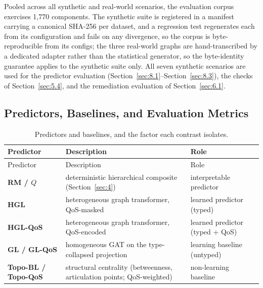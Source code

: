 Pooled across all synthetic and real-world scenarios, the evaluation corpus exercises 1,770
components. The synthetic suite is registered in a manifest carrying a canonical SHA-256 per dataset,
and a regression test regenerates each from its configuration and fails on any divergence, so the
corpus is byte-reproducible from its configs; the three real-world graphs are hand-transcribed by a
dedicated adapter rather than the statistical generator, so the byte-identity guarantee applies to
the synthetic suite only. All seven synthetic scenarios are used for the predictor evaluation
(Section~\ref{sec:8.1}--Section~\ref{sec:8.3}), the checks of Section~\ref{sec:5.4}, and the
remediation evaluation of Section~\ref{sec:6.1}.

\hypertarget{predictors-baselines-and-evaluation-metrics}{%
\subsection{Predictors, Baselines, and Evaluation Metrics}\label{predictors-baselines-and-evaluation-metrics}}

\label{sec:7.2}

\begin{longtable}[]{@{}
  >{\raggedright\arraybackslash}p{}
  >{\raggedright\arraybackslash}p{}
  >{\raggedright\arraybackslash}p{}@{}}
\caption{Predictors and baselines, and the factor each contrast isolates.\label{tab:5}}\tabularnewline
\toprule
Predictor & Description & Role \\
\midrule
\endfirsthead
\toprule
Predictor & Description & Role \\
\midrule
\endhead
\textbf{RM / \(Q\)} & deterministic hierarchical composite (Section~\ref{sec:4}) & interpretable predictor \\
\textbf{HGL} & heterogeneous graph transformer, QoS-masked & learned predictor (typed) \\
\textbf{HGL-QoS} & heterogeneous graph transformer, QoS-encoded & learned predictor (typed + QoS) \\
\textbf{GL / GL-QoS} & homogeneous GAT on the type-collapsed projection & learning baseline (untyped) \\
\textbf{Topo-BL / Topo-QoS} & structural centrality (betweenness, articulation points; QoS-weighted) & non-learning baseline \\
\bottomrule
\end{longtable}

